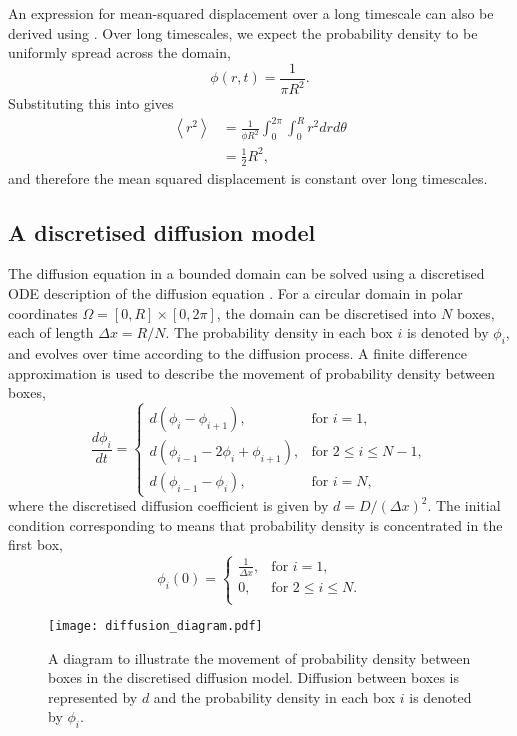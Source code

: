 %
An expression for mean-squared displacement over a long timescale can also be derived using . Over long timescales, we expect the probability density to be uniformly spread across the domain,
%
\begin{equation}
\phi(r,t) = \frac{1}{\pi R^2} .
\end{equation}
%
Substituting this into  gives
%
\begin{align}
\left<r^2\right> &= \frac{1}{\phi R^2}\int_{0}^{2\pi} \int_{0}^{R} r^2 dr d\theta \\
&= \frac{1}{2} R^2,
\end{align}
%
and therefore the mean squared displacement is constant over long timescales.
%
\subsection{A discretised diffusion model} \label{discretised_model}

The diffusion equation in a bounded domain can be solved using a discretised ODE
description of the diffusion equation \cite{woolley2011stochastic}. For a circular domain in polar coordinates $\Omega = [0,R] \times [0, 2\pi]$, the domain can be discretised into $N$ boxes, each of
length $\Delta x=R/N$. The probability density in each box $i$ is denoted by $\phi_i$, and evolves over time according to the diffusion process. A finite difference approximation is used to describe the movement of probability density between boxes,
%
\begin{equation}
\frac{d\phi_i}{dt} = \begin{cases}
		d(\phi_i - \phi_{i+1}), & \text{for } i = 1, \\
		d(\phi_{i-1}-2\phi_i +\phi_{i+1}), & \text{for } 2 \leq i \leq N-1, \\
		d(\phi_{i-1}-\phi_i), & \text{for } i = N ,
		\end{cases}
        \label{eqn:discrete_diffusion}
\end{equation}
%
where the discretised diffusion coefficient is given by
$d = D/(\Delta x)^2$. The initial condition corresponding to  means that probability density is concentrated in the first box,
%
\begin{equation}
\phi_i(0) = \begin{cases}
		\frac{1}{\Delta x}, & \text{for } i = 1, \\
		0, & \text{for } 2 \leq i \leq N. \\
		\end{cases}
        \label{eqn:discrete_diffusion_IC}
\end{equation}
%
\begin{figure} [t]
    \centering
        \texttt{[image: diffusion\_diagram.pdf]}
        \caption{A diagram to illustrate the movement of probability density between boxes in the discretised diffusion model. Diffusion between boxes is represented by $d$ and the probability density in each box $i$ is denoted by $\phi_i$.}
    \label{fig:diffusion_diagram}
\end{figure}

